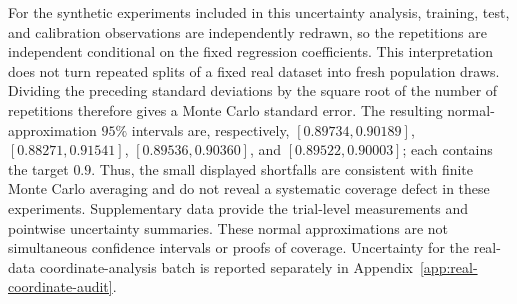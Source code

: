 For the synthetic experiments included in this uncertainty analysis, training, test, and calibration
observations are independently redrawn, so the repetitions are independent
conditional on the fixed regression coefficients. This interpretation does
not turn repeated splits of a fixed real dataset into fresh population draws. Dividing
the preceding standard deviations by the square root of the number of
repetitions therefore gives a Monte Carlo standard error. The resulting
normal-approximation $95\%$ intervals are, respectively,
$[0.89734,0.90189]$, $[0.88271,0.91541]$, $[0.89536,0.90360]$, and
$[0.89522,0.90003]$; each contains the target $0.9$. Thus, the small displayed
shortfalls are consistent with finite Monte Carlo averaging and do not reveal
a systematic coverage defect in these experiments. Supplementary data
provide the trial-level measurements and pointwise uncertainty summaries.
These normal approximations are not simultaneous confidence intervals or
proofs of coverage. Uncertainty for the real-data coordinate-analysis batch
is reported separately in Appendix~\ref{app:real-coordinate-audit}.

\FloatBarrier
\endgroup
